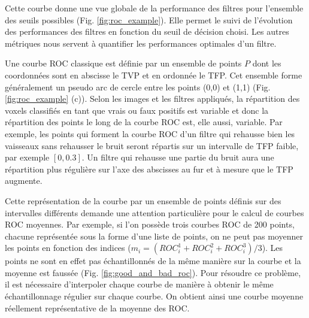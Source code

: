 Cette courbe donne une vue globale de la performance des filtres pour l'ensemble des seuils possibles (Fig. \ref{fig:roc_example}). Elle permet le suivi de l'évolution des performances des filtres en fonction du seuil de décision choisi. Les autres métriques nous servent à quantifier les performances optimales d'un filtre. 

Une courbe ROC classique est définie par un ensemble de points $P$ dont les coordonnées sont en abscisse le TVP et en ordonnée le TFP. Cet ensemble forme généralement un pseudo arc de cercle entre les points (0,0) et (1,1) (Fig. \ref{fig:roc_example} (c)). Selon les images et les filtres appliqués, la répartition des voxels classifiés en tant que vrais ou faux positifs est variable et donc la répartition des points le long de la courbe ROC est, elle aussi, variable. Par exemple, les points qui forment la courbe ROC d'un filtre qui rehausse bien les vaisseaux sans rehausser le bruit seront répartis sur un intervalle de TFP faible, par exemple $[0,0.3]$. Un filtre qui rehausse une partie du bruit aura une répartition plus régulière sur l'axe des abscisses au fur et à mesure que le TFP augmente. 

Cette représentation de la courbe par un ensemble de points définis sur des intervalles différents demande une attention particulière pour le calcul de courbes ROC moyennes. Par exemple, si l'on possède trois courbes ROC de 200 points, chacune représentée sous la forme d'une liste de points, on ne peut pas moyenner les points en fonction des indices ($m_i = (ROC^1_{i} + ROC^2_{i} + ROC^3_{i})/3 $). Les points ne sont en effet pas échantillonnés de la même manière sur la courbe et la moyenne est faussée (Fig. \ref{fig:good_and_bad_roc}). Pour résoudre ce problème, il est nécessaire d'interpoler chaque courbe de manière à obtenir le même échantillonnage régulier sur chaque courbe. On obtient ainsi une courbe moyenne réellement représentative de la moyenne des ROC.

